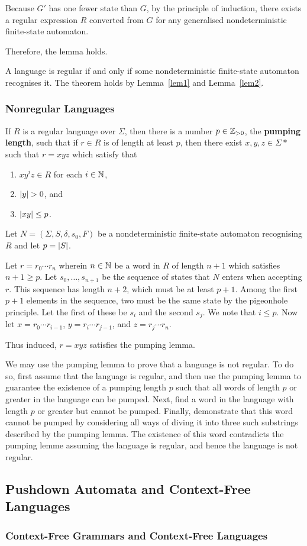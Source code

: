     Because \(G'\) has one fewer state than \(G\), by the principle of
    induction, there exists a regular expression \(R\) converted from \(G\) for
    any generalised nondeterministic finite-state automaton.

    Therefore, the lemma holds.
\Epr

\Bth
    A language is regular if and only if some nondeterministic finite-state
    automaton recognises it.
\Eth
\Bpr
    The theorem holds by Lemma~\ref{lem1} and Lemma~\ref{lem2}.
\Epr

\subsubsection{Nonregular Languages}

    If \(R\) is a regular language over \(\varSigma\), then there is a number
    \(p \in \mathbb{Z}_{>0}\), the {\bf pumping length}, such that if \(r \in R\) is of
    length at least \(p\), then there exist \(x, y, z \in \varSigma*\) such that
    \(r = x y z\) which satisfy that
    \begin{enumerate}
        \item \(x y^i z \in R\) for each \(i \in \mathbb{N}\),
        \item \(\lvert y\rvert > 0\), and
        \item \(\lvert x y \rvert \leq p\).
    \end{enumerate}
\Eth
\Bpr
    Let \(N = (\varSigma, S, \delta, s_0, F)\) be a nondeterministic
    finite-state automaton recognising \(R\) and let \(p = \lvert S\rvert\).

    Let \(r = r_0 \cdots r_n\) wherein \(n \in \mathbb{N}\) be a word in \(R\) of
    length \(n + 1\) which satisfies \(n + 1 \geq p\). Let \(s_0, \ldots, s_{n +
    1}\) be the sequence of states that \(N\) enters when accepting \(r\). This
    sequence has length \(n + 2\), which must be at least \(p + 1\). Among the
    first \(p + 1\) elements in the sequence, two must be the same state by the
    pigeonhole principle. Let the first of these be \(s_i\) and the second
    \(s_j\). We note that \(i \leq p\). Now let \(x = r_0 \cdots r_{i - 1}\),
    \(y = r_i \cdots r_{j - 1}\), and \(z = r_j \cdots r_n\).

    Thus induced, \(r = x y z\) satisfies the pumping lemma.
\Epr

We may use the pumping lemma to prove that a language is not regular. To do so,
first assume that the language is regular, and then use the pumping lemma to
guarantee the existence of a pumping length \(p\) such that all words of length
\(p\) or greater in the language can be pumped. Next, find a word in the
language with length \(p\) or greater but cannot be pumped. Finally, demonstrate
that this word cannot be pumped by considering all ways of diving it into three
such substrings described by the pumping lemma. The existence of this word
contradicts the pumping lemme assuming the language is regular, and hence the
language is not regular.

\subsection{Pushdown Automata and Context-Free Languages}

\subsubsection{Context-Free Grammars and Context-Free Languages}

\Edc

